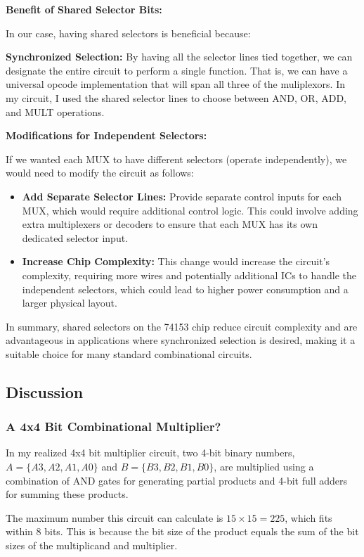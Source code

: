 \documentclass[12pt]{article}
\begin{document}
\textbf{Benefit of Shared Selector Bits:}

In our case, having shared selectors is beneficial because:
	\item \textbf{Synchronized Selection:} 
        By having all the selector lines tied together, we can designate the entire circuit to perform a single function. That is, we can have a universal opcode implementation that will span all three of the muliplexors. In my circuit, I used the shared selector lines to choose between AND, OR, ADD, and MULT operations. 


\textbf{Modifications for Independent Selectors:}

If we wanted each MUX to have different selectors (operate independently), we would need to modify the circuit as follows:
\begin{itemize}
	\item \textbf{Add Separate Selector Lines:} Provide separate control inputs for each MUX, which would require additional control logic. This could involve adding extra multiplexers or decoders to ensure that each MUX has its own dedicated selector input.
	\item \textbf{Increase Chip Complexity:} This change would increase the circuit’s complexity, requiring more wires and potentially additional ICs to handle the independent selectors, which could lead to higher power consumption and a larger physical layout.
\end{itemize}
In summary, shared selectors on the 74153 chip reduce circuit complexity and are advantageous in applications where synchronized selection is desired, making it a suitable choice for many standard combinational circuits.
\subsection*{Discussion}
\subsubsection*{A 4x4 Bit Combinational Multiplier?}
In my realized 4x4 bit multiplier circuit, two 4-bit binary numbers, \( A = \{A3, A2, A1, A0\} \) and \( B = \{B3, B2, B1, B0\} \), are multiplied using a combination of AND gates for generating partial products and 4-bit full adders for summing these products.

The maximum number this circuit can calculate is \( 15 \times 15 = 225 \), which fits within 8 bits. This is because the bit size of the product equals the sum of the bit sizes of the multiplicand and multiplier.
\end{document}
